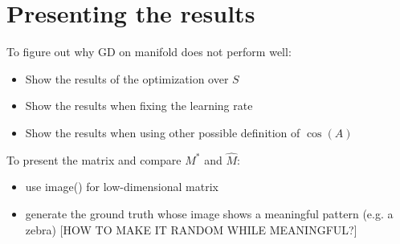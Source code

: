 \documentclass[12pt]{article}%
\begin{document}
\section{Presenting the results}
To figure out why GD on manifold does not perform well:
\begin{itemize}
\item Show the results of the optimization over $S$
\item Show the results when fixing the learning rate
\item Show the results when using other possible definition of $\cos(A)$
\end{itemize}
To present the matrix and compare $M^*$ and $\hat M$:
\begin{itemize}
\item use image() for low-dimensional matrix
\item generate the ground truth whose image shows a meaningful pattern (e.g. a zebra) [HOW TO MAKE IT RANDOM WHILE MEANINGFUL?]
\end{itemize}
\end{document}
